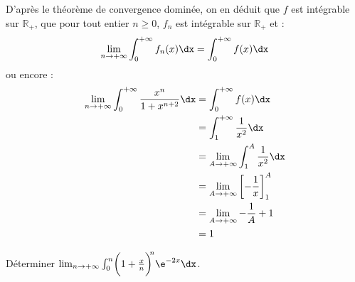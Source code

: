 \documentclass[a4paper,10pt]{report}
\begin{document}
D'après le théorème de convergence dominée, on en déduit que $f$ est intégrable sur $\mathbb{R}_+$, que pour tout entier $n \geq 0$, $f_n$ est intégrable sur $\mathbb{R}_+$ et :
$$ \lim_{n \rightarrow + \infty} \int_0^{+ \infty} f_n(x) \dx = \int_0^{+ \infty} f(x) \dx$$
ou encore :
\begin{align*}
\lim_{n \rightarrow + \infty} \int_0^{+ \infty} \dfrac{x^n}{1+x^{n+2}} \dx & = \int_0^{+ \infty} f(x) \dx \\
& = \int_1^{+ \infty} \dfrac{1}{x^2} \dx \\
& = \lim_{A \rightarrow + \infty} \int_1^{A} \dfrac{1}{x^2} \dx \\
& = \lim_{A \rightarrow + \infty} \left[ - \dfrac{1}{x} \right]_1^A \\
& = \lim_{A \rightarrow + \infty} - \dfrac{1}{A} + 1 \\
& = 1
\end{align*}



\begin{Exercice}{} Déterminer $\lim_{n \to + \infty} \int_{0}^{n} \biggl( 1 + \frac{x}{n} \biggr)^{\!\!n} \e^{ - 2x} \dx$.
\end{Exercice}
\end{document}
